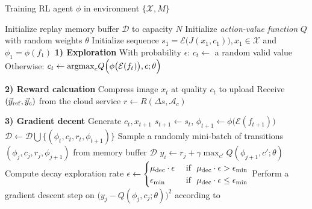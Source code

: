 \begin{algorithm}[!t]
	\caption{Training RL agent $ \phi $ in environment $ \{\mathcal{X}, M\} $}
	\label{alg: rl-train}
	\begin{algorithmic}[1]
		\STATE Initialize replay memory buffer $ \mathcal{D} $ to capacity $ N $
		\STATE Initialize \emph{action-value function} $ Q $ with random weights $ \theta $
		\STATE Initialize sequence $ s_1 = \mathcal{E}\big(J(x_1, c_1)\big), x_1 \in \mathcal{X} $ and $ \phi_1 = \phi(f_1) $
		{\color{revise}\STATE \textbf{1) Exploration}}
		{\color{revise}\STATE With probability $\epsilon$:}
		\STATE \hspace{1em} $c_t \leftarrow$ a random valid value 
		\STATE Otherwise:
		\STATE \hspace{1em} $ c_t \leftarrow {\rm argmax}_cQ\Big(\phi\big(\mathcal{E}(f_t)\big), c; \theta\Big) $

		\STATE
		
		{\color{revise}\STATE \textbf{2) Reward calcuation}} 
		\STATE Compress image $ x_t $ at quality $ c_t $ to upload
		\STATE Receive $ (\vec{y}_{\rm ref}, \vec{y}_c) $ from the cloud service
		\STATE $ r \leftarrow R(\Delta s, \mathcal{A}_c) $
		
		\STATE 
		{\color{revise}\STATE \textbf{3) Gradient decent}}
		{\color{revise}\STATE Generate $ c_t, x_{t+1} $}
		\STATE $ s_{t+1} \leftarrow s_t $, $ \phi_{t+1} \leftarrow \phi \big(\mathcal{E}(f_{t+1})\big) $
		\STATE $ \mathcal{D} \leftarrow \mathcal{D} \bigcup \{(\phi_t, c_t, r_t, \phi_{t+1}) \} $
		{\color{revise}
		\STATE Sample a randomly mini-batch of transitions $ (\phi_j, c_j, r_j, \phi_{j+1}) $ from memory buffer $ \mathcal{D} $
		\STATE $ y_i \leftarrow r_j + \gamma \max_{c'}Q(\phi_{j+1}, c'; \theta) $
		\STATE Compute decay exploration rate 
		$ \epsilon \leftarrow 
		\begin{cases}
		\mu_{\rm dec}\cdot \epsilon & \text{ if } \ \mu_{\rm dec}\cdot \epsilon > \epsilon_{\min} \\ 
		\epsilon_{\min}             & \text{ if } \ \mu_{\rm dec}\cdot \epsilon \leq \epsilon_{\min}
		\end{cases} $
		\STATE Perform a gradient descent step on $ \big(y_j - Q(\phi_j, c_j; \theta)\big)^2 $ according to~\cite{DQN}
		}
		\ENDIF
		\ENDFOR
	\end{algorithmic}
\end{algorithm}

